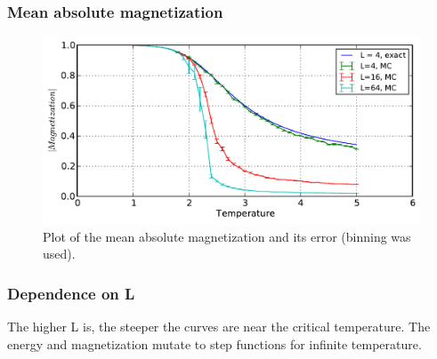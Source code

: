 \documentclass[12pt,a4paper]{scrartcl}
\begin{document}
\subsubsection*{Mean absolute magnetization}
\begin{figure}[H]
\includegraphics[width=13.0cm]{../plots/1simulation_02.pdf}
\caption{Plot of the mean absolute magnetization and its error (binning was used).}
\end{figure}

\subsubsection*{Dependence on L}
The higher L is, the steeper the curves are near the critical temperature. The energy and magnetization mutate to step functions for infinite temperature.
\end{document}

